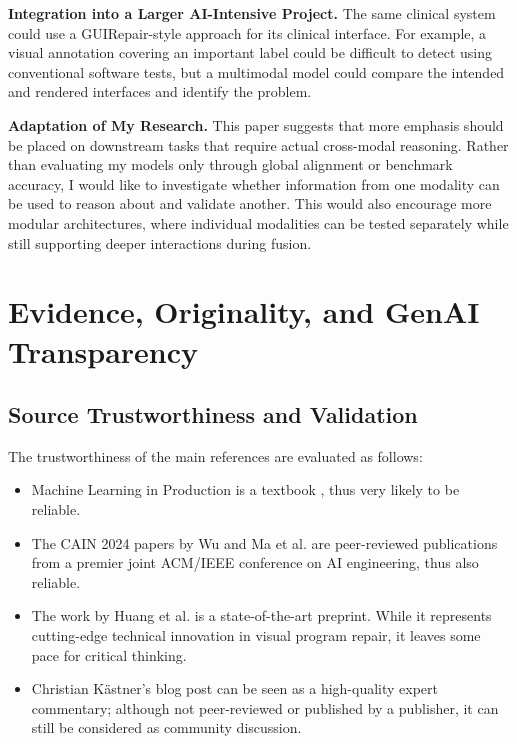 \documentclass[11pt,a4paper]{article}
\begin{document}
\textbf{Integration into a Larger AI-Intensive Project.} The same clinical system could use a GUIRepair-style approach for its clinical interface. For example, a visual annotation covering an important label could be difficult to detect using conventional software tests, but a multimodal model could compare the intended and rendered interfaces and identify the problem.

\textbf{Adaptation of My Research.} This paper suggests that more emphasis should be placed on downstream tasks that require actual cross-modal reasoning. Rather than evaluating my models only through global alignment or benchmark accuracy, I would like to investigate whether information from one modality can be used to reason about and validate another. This would also encourage more modular architectures, where individual modalities can be tested separately while still supporting deeper interactions during fusion.



\section{Evidence, Originality, and GenAI Transparency}

\subsection{Source Trustworthiness and Validation}

The trustworthiness of the main references are evaluated as follows:

\begin{itemize}

    \item  Machine Learning in Production is a textbook \cite{kaestner2024mlip}, thus very likely to be reliable. 

    \item The CAIN 2024 papers by Wu \cite{wu2024exploratory} and Ma et al. \cite{li24} are peer-reviewed publications from a premier joint ACM/IEEE conference on AI engineering, thus also reliable. 
    
    \item The work by Huang et al. \cite{huang2025seeing} is a state-of-the-art preprint. While it represents cutting-edge technical innovation in visual program repair, it leaves some pace for critical thinking.
    
    \item   Christian K{\"a}stner's blog post \cite{kaestner2023slicing} can be seen as a high-quality expert commentary; although not peer-reviewed or published by a publisher, it can still be considered as community discussion.
\end{itemize}
\end{document}
